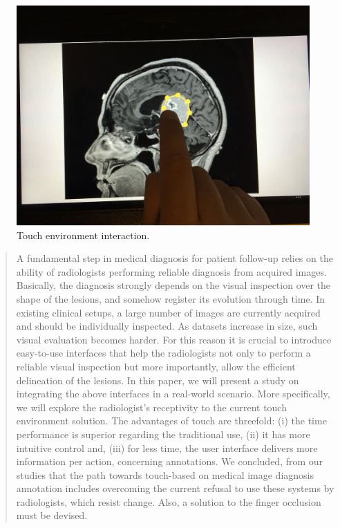 \documentclass{sigchi}
\begin{document}
\begin{figure}[h]
\centering
\includegraphics[width=1.0\columnwidth]{header_2.jpg}
\caption{Touch environment interaction.}
\label{fig:Fig2}
\end{figure}

\begin{abstract}

A fundamental step in medical diagnosis for patient follow-up relies on the ability of radiologists performing reliable diagnosis from acquired images. Basically, the diagnosis strongly depends on the visual inspection over the shape of the lesions, and somehow register its evolution through time. In existing clinical setups, a large number of images are currently acquired and should be individually inspected. As datasets increase in size, such visual evaluation becomes harder. For this reason it is crucial to introduce easy-to-use interfaces that help the radiologists not only to perform a reliable visual inspection but more importantly, allow the efficient delineation of the lesions. In this paper, we will present a study on integrating the above interfaces in a real-world scenario. More specifically, we will explore the radiologist's receptivity to the current touch environment solution. The advantages of touch are threefold: (i) the time performance is superior regarding the traditional use, (ii) it has more intuitive control and, (iii) for less time, the user interface delivers more information per action, concerning annotations. We concluded, from our studies that the path towards touch-based on medical image diagnosis annotation includes overcoming the current refusal to use these systems by radiologists, which resist change.  Also, a solution to the finger occlusion must be devised.

\end{abstract}
\end{document}
